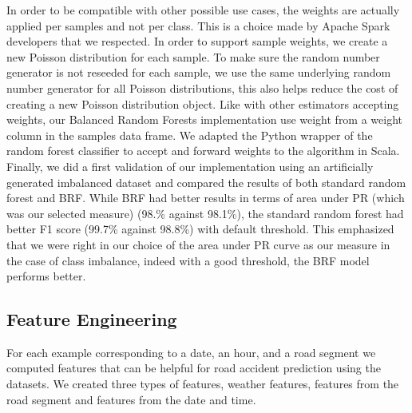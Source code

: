 \documentclass[conference]{IEEEtran}
\begin{document}
In order to be compatible with other possible use cases, the weights are actually applied per samples and not per class.
This is a choice made by Apache Spark developers that we respected.
In order to support sample weights, we create a new Poisson distribution for each sample.
To make sure the random number generator is not reseeded for each sample, we use the same underlying random number generator for all Poisson distributions, this also helps reduce the cost of creating a new Poisson distribution object.
Like with other estimators accepting weights, our Balanced Random Forests implementation use weight from a weight column in the samples data frame.
We adapted the Python wrapper of the random forest classifier to accept and forward weights to the algorithm in Scala.
Finally, we did a first validation of our implementation using an artificially generated imbalanced dataset and compared the results of both standard random forest and BRF.
While BRF had better results in terms of area under PR (which was our selected measure) (98.\% against 98.1\%), the standard random forest had better F1 score (99.7\% against 98.8\%) with default threshold.
This emphasized that we were right in our choice of the area under PR curve as our measure in the case of class imbalance, indeed with a good threshold, the BRF model performs better.

\subsection{Feature Engineering}
For each example corresponding to a date, an hour, and a road segment we computed features that can be helpful for road accident prediction using the datasets. We created three types of features, weather features, features from the road segment and features from the date and time.
\end{document}
